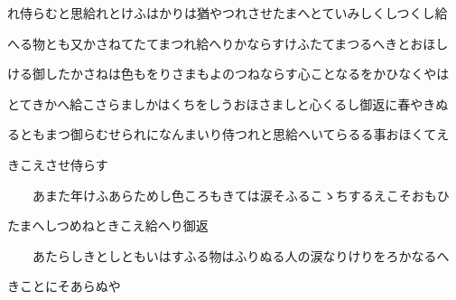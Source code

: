 \documentclass[a4paper,11pt,landscape]{ltjtarticle}
\begin{document}
れ侍らむと思給れとけふはかりは猶やつれさせたまへとていみしくしつくし給
\par\medskip
へる物とも又かさねてたてまつれ給へりかならすけふたてまつるへきとおほし
\par\medskip
ける御したかさねは色もをりさまもよのつねならす心ことなるをかひなくやは
\par\medskip
とてきかへ給こさらましかはくちをしうおほさましと心くるし御返に春やきぬ
\par\medskip
るともまつ御らむせられになんまいり侍つれと思給へいてらるる事おほくてえ
\par\medskip
きこえさせ侍らす
\par\medskip
　　あまた年けふあらためし色ころもきては涙そふるこゝちするえこそおもひ
\par\medskip
たまへしつめねときこえ給へり御返
\par\medskip
　　あたらしきとしともいはすふる物はふりぬる人の涙なりけりをろかなるへ
\par\medskip
きことにそあらぬや
\par\medskip
\end{document}
